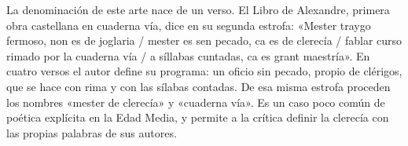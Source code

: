 \documentclass{book}
\begin{document}
La denominación de este arte nace de un verso. El Libro de Alexandre, primera obra castellana en cuaderna vía, dice en su segunda estrofa: «Mester traygo fermoso, non es de joglaria / mester es sen pecado, ca es de clerecía / fablar curso rimado por la cuaderna vía / a síllabas cuntadas, ca es grant maestría». En cuatro versos el autor define su programa: un oficio sin pecado, propio de clérigos, que se hace con rima y con las sílabas contadas. De esa misma estrofa proceden los nombres «mester de clerecía» y «cuaderna vía». Es un caso poco común de poética explícita en la Edad Media, y permite a la crítica definir la clerecía con las propias palabras de sus autores.

\end{document}
